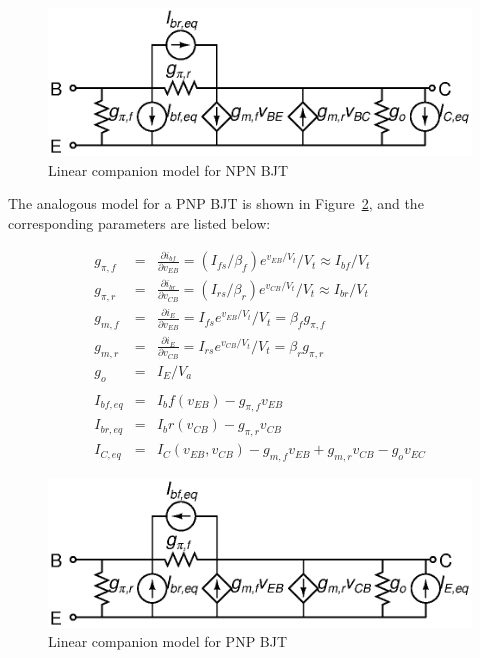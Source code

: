 \documentclass{article}
\begin{document}
\begin{figure}[h]
\begin{center}
\includegraphics{fig/npn.eps}
\caption{Linear companion model for NPN BJT \label{fig:npn}}
\end{center}
\end{figure}

The analogous model for a PNP BJT is shown in Figure~\ref{fig:pnp}, and the corresponding parameters are listed below:

\begin{eqnarray}
g_{\pi,f}&=&\frac{\partial i_{bf}}{\partial v_{EB}}=(I_{fs}/\beta_f)e^{v_{EB}/V_t}/V_t \approx I_{bf}/V_t \\
g_{\pi,r}&=&\frac{\partial i_{br}}{\partial v_{CB}}=(I_{rs}/\beta_r)e^{v_{CB}/V_t}/V_t \approx I_{br}/V_t \\
g_{m,f}&=&\frac{\partial i_E}{\partial v_{EB}}=I_{fs}e^{v_{EB}/V_t}/V_t=\beta_fg_{\pi,f} \\
g_{m,r}&=&\frac{\partial i_E}{\partial v_{CB}}=I_{rs}e^{v_{CB}/V_t}/V_t=\beta_rg_{\pi,r} \\
g_o&=&I_E/V_a \\
\nonumber \\
I_{bf,eq}&=&I_bf(v_{EB})-g_{\pi,f}v_{EB} \\
I_{br,eq}&=&I_br(v_{CB})-g_{\pi,r}v_{CB} \\
I_{C,eq}&=&I_C(v_{EB},v_{CB})-g_{m,f}v_{EB}+g_{m,r}v_{CB}-g_ov_{EC}
\end{eqnarray}

\begin{figure}[h]
\begin{center}
\includegraphics{fig/pnp.eps}
\caption{Linear companion model for PNP BJT \label{fig:pnp}}
\end{center}
\end{figure}
\end{document}

